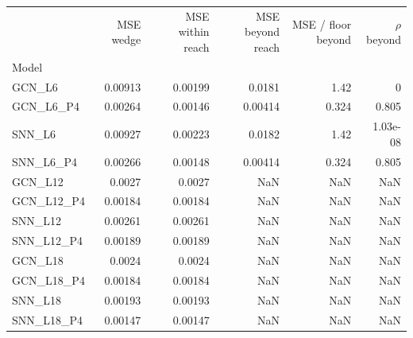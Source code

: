\begin{tabular}{lrrrrr}
\toprule
 & MSE wedge & MSE within reach & MSE beyond reach & MSE / floor beyond & $\rho$ beyond \\
Model &  &  &  &  &  \\
\midrule
GCN\_L6 & 0.00913 & 0.00199 & 0.0181 & 1.42 & 0 \\
GCN\_L6\_P4 & 0.00264 & 0.00146 & 0.00414 & 0.324 & 0.805 \\
SNN\_L6 & 0.00927 & 0.00223 & 0.0182 & 1.42 & 1.03e-08 \\
SNN\_L6\_P4 & 0.00266 & 0.00148 & 0.00414 & 0.324 & 0.805 \\
GCN\_L12 & 0.0027 & 0.0027 & NaN & NaN & NaN \\
GCN\_L12\_P4 & 0.00184 & 0.00184 & NaN & NaN & NaN \\
SNN\_L12 & 0.00261 & 0.00261 & NaN & NaN & NaN \\
SNN\_L12\_P4 & 0.00189 & 0.00189 & NaN & NaN & NaN \\
GCN\_L18 & 0.0024 & 0.0024 & NaN & NaN & NaN \\
GCN\_L18\_P4 & 0.00184 & 0.00184 & NaN & NaN & NaN \\
SNN\_L18 & 0.00193 & 0.00193 & NaN & NaN & NaN \\
SNN\_L18\_P4 & 0.00147 & 0.00147 & NaN & NaN & NaN \\
\bottomrule
\end{tabular}
